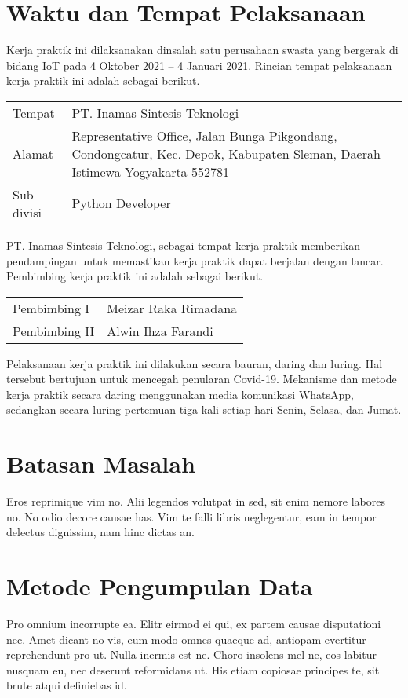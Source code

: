 \section{Waktu dan Tempat Pelaksanaan}
Kerja praktik ini dilaksanakan dinsalah satu perusahaan swasta yang bergerak di bidang IoT pada 4 Oktober 2021 – 4 Januari 2021. Rincian tempat pelaksanaan kerja praktik ini adalah sebagai berikut.

\noindent
\begin{tabular}{@{}p{}@{: }p{}}
  Tempat & PT. Inamas Sintesis Teknologi \\ 
  Alamat & Representative Office, Jalan Bunga Pikgondang, Condongcatur, Kec. Depok, Kabupaten Sleman, Daerah Istimewa Yogyakarta 552781 \\
  Sub divisi & Python Developer
\end{tabular}

PT. Inamas Sintesis Teknologi, sebagai tempat kerja praktik memberikan pendampingan untuk memastikan kerja praktik dapat berjalan dengan lancar. Pembimbing kerja praktik ini adalah sebagai berikut.

\noindent
\begin{tabular}{@{}p{}@{: }p{}}
  Pembimbing I & Meizar Raka Rimadana \\
  Pembimbing II	& Alwin Ihza Farandi
\end{tabular}

Pelaksanaan kerja praktik ini dilakukan secara bauran, daring dan luring. Hal tersebut bertujuan untuk mencegah penularan Covid-19. Mekanisme dan metode kerja praktik secara daring menggunakan media komunikasi WhatsApp, sedangkan secara luring pertemuan tiga kali setiap hari Senin, Selasa, dan Jumat.


\section{Batasan Masalah}
Eros reprimique vim no. Alii legendos volutpat in sed, sit enim nemore labores no. No odio decore causae has. Vim te falli libris neglegentur, eam in tempor delectus dignissim, nam hinc dictas an.


\section{Metode Pengumpulan Data}
Pro omnium incorrupte ea. Elitr eirmod ei qui, ex partem causae disputationi nec. Amet dicant no vis, eum modo omnes quaeque ad, antiopam evertitur reprehendunt pro ut. Nulla inermis est ne. Choro insolens mel ne, eos labitur nusquam eu, nec deserunt reformidans ut. His etiam copiosae principes te, sit brute atqui definiebas id.

